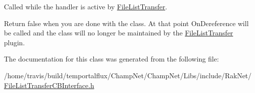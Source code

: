 Called while the handler is active by \hyperlink{class_rak_net_1_1_file_list_transfer}{File\-List\-Transfer}. 

Return false when you are done with the class. At that point On\-Dereference will be called and the class will no longer be maintained by the \hyperlink{class_rak_net_1_1_file_list_transfer}{File\-List\-Transfer} plugin. 

The documentation for this class was generated from the following file\-:\begin{DoxyCompactItemize}
\item 
/home/travis/build/temportalflux/\-Champ\-Net/\-Champ\-Net/\-Libs/include/\-Rak\-Net/\hyperlink{_file_list_transfer_c_b_interface_8h}{File\-List\-Transfer\-C\-B\-Interface.\-h}\end{DoxyCompactItemize}
